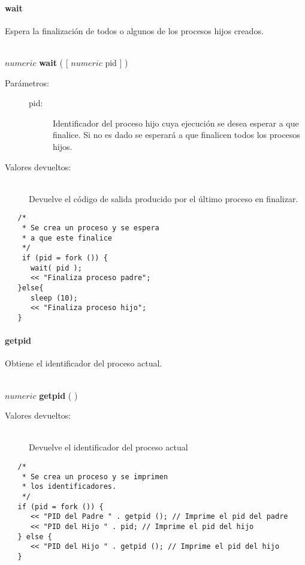 \paragraph{wait}
Espera la finalización de todos o algunos de los procesos hijos creados.


\begin{framed}
\hfill \\ $numeric$ \textbf{wait} ( [ $numeric$ pid ] )  
\begin{description}
\item [Parámetros:] \hfill 
   \begin{description}
   \item[pid:] Identificador del proceso hijo cuya ejecución se desea esperar a que 
   finalice. Si no es dado se esperará a que finalicen todos los procesos hijos.
   \end{description}
\item[Valores devueltos:] \hfill \\
   Devuelve el código de salida producido por el último proceso en finalizar.
\end{description}
\end{framed}
     
\begin{lstlisting}  
   /*
    * Se crea un proceso y se espera
    * a que este finalice
    */
    if (pid = fork ()) {
      wait( pid );
      << "Finaliza proceso padre";
   }else{
      sleep (10);
      << "Finaliza proceso hijo";
   }
\end{lstlisting}

\paragraph{getpid}
Obtiene el identificador del proceso actual.


\begin{framed}
\hfill \\ $numeric$ \textbf{getpid} ( )  
\begin{description}
\item[Valores devueltos:] \hfill \\
   Devuelve el identificador del proceso actual
\end{description}
\end{framed}
     
\begin{lstlisting}  
   /*
    * Se crea un proceso y se imprimen
    * los identificadores.
    */
   if (pid = fork ()) {
      << "PID del Padre " . getpid (); // Imprime el pid del padre
      << "PID del Hijo " . pid; // Imprime el pid del hijo
   } else {
      << "PID del Hijo " . getpid (); // Imprime el pid del hijo
   }
\end{lstlisting}

